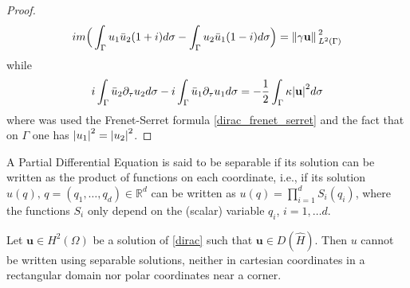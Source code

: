 \begin{proof}
    \begin{align*}
    i m \Big(\int_{\Gamma} u_1\bar{u}_2(1+i)d\sigma - \int_{\Gamma} u_2\bar{u}_1(1-i)d\sigma \Big) = \norm*{\gamma \mathbf{u}}_{L^2(\Gamma)}^2
    \end{align*}
    while
    \begin{align*}
    i\int_{\Gamma} \bar{u}_2 \partial_\tau u_2 d \sigma -  i\int_{\Gamma} \bar{u}_1 \partial_\tau u_1 d \sigma = -\frac{1}{2}\int_{\Gamma}\kappa \abs{\mathbf{u}}^2 d\sigma
    \end{align*}
    where was used the Frenet-Serret formula \eqref{dirac_frenet_serret} and the fact that on \(\Gamma\) one has \(\abs{u_1}^2=\abs{u_2}^2\).
\end{proof}

A Partial Differential Equation is said to be separable if its solution can be written as the product of functions on each coordinate, i.e., if its solution \(u(q), \, q=\left(q_1,\dots,q_d\right) \in \mathbb{R}^d\) can be written as \(u(q) = \prod_{i=1}^{d} S_i(q_i)\), where the functions \(S_i\) only depend on the (scalar) variable \(q_i\), \(i=1,\dots d\).

\begin{proposition}\label{dirac_not_polar}
    Let \(\mathbf{u} \in H^2(\Omega)\) be a solution of \eqref{dirac} such that \(\mathbf{u} \in D(\hat{H})\). Then \(u\) cannot be written using separable solutions, neither in cartesian coordinates in a rectangular domain nor polar coordinates near a corner.
\end{proposition}

